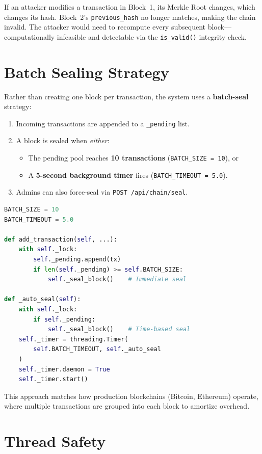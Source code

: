 \documentclass[12pt, a4paper]{report}
\begin{document}
If an attacker modifies a transaction in Block~1, its Merkle Root changes, which
changes its hash. Block~2's \texttt{previous\_hash} no longer matches, making
the chain invalid. The attacker would need to recompute every subsequent
block—computationally infeasible and detectable via the \texttt{is\_valid()}
integrity check.

\section{Batch Sealing Strategy}

Rather than creating one block per transaction, the system uses a
\textbf{batch-seal} strategy:

\begin{enumerate}
    \item Incoming transactions are appended to a \texttt{\_pending} list.
    \item A block is sealed when \textit{either}:
    \begin{itemize}
        \item The pending pool reaches \textbf{10 transactions}
              (\texttt{BATCH\_SIZE = 10}), or
        \item A \textbf{5-second background timer} fires
              (\texttt{BATCH\_TIMEOUT = 5.0}).
    \end{itemize}
    \item Admins can also force-seal via \texttt{POST /api/chain/seal}.
\end{enumerate}

\begin{lstlisting}[language=Python, caption={Batch seal logic.}]
BATCH_SIZE = 10
BATCH_TIMEOUT = 5.0

def add_transaction(self, ...):
    with self._lock:
        self._pending.append(tx)
        if len(self._pending) >= self.BATCH_SIZE:
            self._seal_block()    # Immediate seal

def _auto_seal(self):
    with self._lock:
        if self._pending:
            self._seal_block()    # Time-based seal
    self._timer = threading.Timer(
        self.BATCH_TIMEOUT, self._auto_seal
    )
    self._timer.daemon = True
    self._timer.start()
\end{lstlisting}

This approach matches how production blockchains (Bitcoin, Ethereum) operate, where multiple transactions are grouped into each block to amortize overhead.

\section{Thread Safety}
\end{document}
